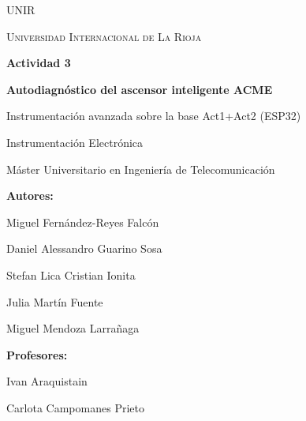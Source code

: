 \begin{titlepage}
\centering

\vspace*{1.5cm}

{\scshape\Large UNIR\par}
{\scshape Universidad Internacional de La Rioja\par}

\vspace{2.5cm}

{\Large\bfseries Actividad 3\par}

\vspace{1.8cm}

\vspace{0.6cm}

{\huge\bfseries Autodiagnóstico del ascensor inteligente ACME\par}
\vspace{0.3cm}
{\Large Instrumentación avanzada sobre la base Act1+Act2 (ESP32)\par}

\vspace{0.6cm}


\vspace{1.5cm}

{\large Instrumentación Electrónica\par}
\vspace{0.3cm}
{\large Máster Universitario en Ingeniería de Telecomunicación\par}

\vfill

\textbf{Autores:}\\[4pt]
{\large Miguel Fernández-Reyes Falcón\par}
{\large Daniel Alessandro Guarino Sosa\par}
{\large Stefan Lica Cristian Ionita\par}
{\large Julia Martín Fuente\par}
{\large Miguel Mendoza Larrañaga\par}

\vspace{1cm}

\textbf{Profesores:}\\[4pt]
{\large Ivan Araquistain\par}
{\large Carlota Campomanes Prieto\par}

\vspace{1.5cm}

\end{titlepage}
